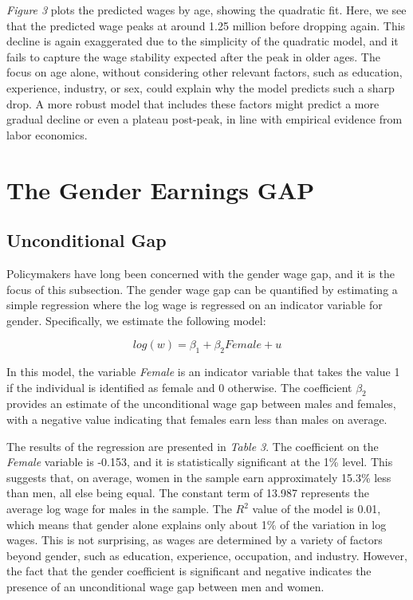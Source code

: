 \documentclass[11pt,a4paper,onecolumn]{article}
\begin{document}
    \textit{Figure 3} plots the predicted wages by age, showing the quadratic fit. Here, we see that the predicted wage peaks at around 1.25 million before dropping again. This decline is again exaggerated due to the simplicity of the quadratic model, and it fails to capture the wage stability expected after the peak in older ages. The focus on age alone, without considering other relevant factors, such as education, experience, industry, or sex, could explain why the model predicts such a sharp drop. A more robust model that includes these factors might predict a more gradual decline or even a plateau post-peak, in line with empirical evidence from labor economics. 




\section{The Gender Earnings GAP}

    \subsection{Unconditional Gap}

        Policymakers have long been concerned with the gender wage gap, and it is the focus of this subsection. The gender wage gap can be quantified by estimating a simple regression where the log wage is regressed on an indicator variable for gender. Specifically, we estimate the following model:
    
        \begin{equation}
            log(w) = \beta_1 + \beta_2 Female + u
        \end{equation}
        
        In this model, the variable \textit{Female} is an indicator variable that takes the value 1 if the individual is identified as female and 0 otherwise. The coefficient $\beta_2$ provides an estimate of the unconditional wage gap between males and females, with a negative value indicating that females earn less than males on average.
        
        
        The results of the regression are presented in \textit{Table 3}. The coefficient on the \textit{Female} variable is -0.153, and it is statistically significant at the 1\% level. This suggests that, on average, women in the sample earn approximately 15.3\% less than men, all else being equal. The constant term of 13.987 represents the average log wage for males in the sample. The $R^2$ value of the model is 0.01, which means that gender alone explains only about 1\% of the variation in log wages. This is not surprising, as wages are determined by a variety of factors beyond gender, such as education, experience, occupation, and industry. However, the fact that the gender coefficient is significant and negative indicates the presence of an unconditional wage gap between men and women.
        
\end{document}
